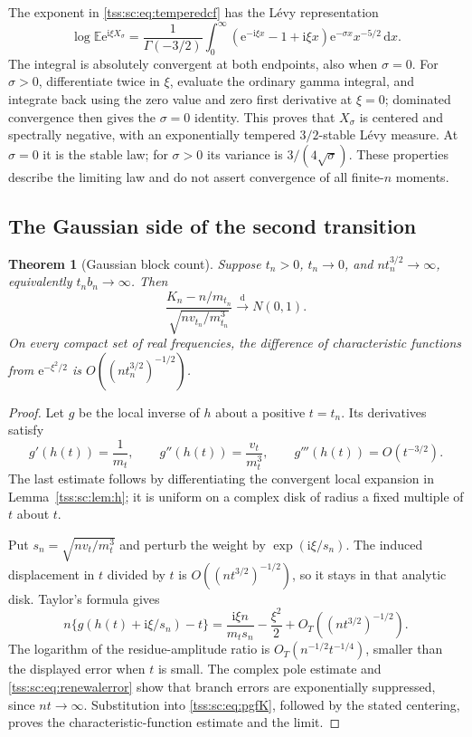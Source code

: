 \documentclass[11pt]{article}
\newtheorem{theorem}{Theorem}[section]
\theoremstyle{remark}\newtheorem{remark}[theorem]{Remark}
\theoremstyle{definition}\newtheorem{definition}[theorem]{Definition}
\newcommand{\ii}{\mathrm i}
\newcommand{\dd}{\mathrm d}
\newcommand{\e}{\mathrm e}
\newcommand{\E}{\mathbb E}
\newcommand{\dto}{\xrightarrow{\mathrm d}}
\begin{document}
The exponent in \eqref{tss:sc:eq:temperedcf} has the L\'evy representation
\begin{equation}\label{tss:sc:eq:levy}
 \log\E\e^{\ii\xi X_\sigma}
 =\frac1{\Gamma(-3/2)}\int_0^\infty
 (\e^{-\ii\xi x}-1+\ii\xi x)\e^{-\sigma x}x^{-5/2}\,\dd x.
\end{equation}
The integral is absolutely convergent at both endpoints, also when $\sigma=0$. For $\sigma>0$, differentiate twice in $\xi$, evaluate the ordinary gamma integral, and integrate back using the zero value and zero first derivative at $\xi=0$; dominated convergence then gives the $\sigma=0$ identity. This proves that $X_\sigma$ is centered and spectrally negative, with an exponentially tempered $3/2$-stable L\'evy measure. At $\sigma=0$ it is the stable law; for $\sigma>0$ its variance is $3/(4\sqrt\sigma)$. These properties describe the limiting law and do not assert convergence of all finite-$n$ moments.

\subsection{The Gaussian side of the second transition}
\begin{theorem}[Gaussian block count]\label{tss:sc:thm:gaussian}
Suppose $t_n>0$, $t_n\to0$, and $n t_n^{3/2}\to\infty$, equivalently $t_nb_n\to\infty$. Then
\begin{equation}\label{tss:sc:eq:CLT}
 \frac{K_n-n/m_{t_n}}
 {\sqrt{n v_{t_n}/m_{t_n}^3}}\dto N(0,1).
\end{equation}
On every compact set of real frequencies, the difference of characteristic functions from $\e^{-\xi^2/2}$ is
$O((n t_n^{3/2})^{-1/2})$.
\end{theorem}
\begin{proof}
Let $g$ be the local inverse of $h$ about a positive $t=t_n$. Its derivatives satisfy
\[
 g'(h(t))=\frac1{m_t},\qquad
 g''(h(t))=\frac{v_t}{m_t^3},\qquad
 g'''(h(t))=O(t^{-3/2}).
\]
The last estimate follows by differentiating the convergent local expansion in Lemma~\ref{tss:sc:lem:h}; it is uniform on a complex disk of radius a fixed multiple of $t$ about $t$.

Put $s_n=\sqrt{n v_t/m_t^3}$ and perturb the weight by $\exp(\ii\xi/s_n)$. The induced displacement in $t$ divided by $t$ is
$O((n t^{3/2})^{-1/2})$, so it stays in that analytic disk. Taylor's formula gives
\[
 n\{g(h(t)+\ii\xi/s_n)-t\}
 =\frac{\ii\xi n}{m_t s_n}-\frac{\xi^2}{2}
      +O_T((n t^{3/2})^{-1/2}).
\]
The logarithm of the residue-amplitude ratio is
$O_T(n^{-1/2}t^{-1/4})$, smaller than the displayed error when $t$ is small. The complex pole estimate and \eqref{tss:sc:eq:renewalerror} show that branch errors are exponentially suppressed, since $nt\to\infty$. Substitution into \eqref{tss:sc:eq:pgfK}, followed by the stated centering, proves the characteristic-function estimate and the limit.
\end{proof}
\end{document}
